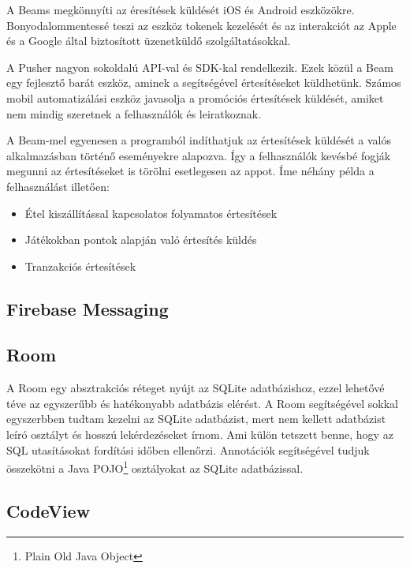 \documentclass{thesis-ekf}
\theoremstyle{definition}
\theoremstyle{remark}
\begin{document}
A Beams megkönnyíti az éresítések küldését iOS és Android eszközökre.
Bonyodalommentessé teszi az eszköz tokenek kezelését és az interakciót az Apple és a Google által biztosított üzenetküldő szolgáltatásokkal.

A Pusher nagyon sokoldalú API-val és SDK-kal rendelkezik. 
Ezek közül a Beam egy fejlesztő barát eszköz, aminek a segítségével értesítéseket küldhetünk.
Számos mobil automatizálási eszköz javasolja a promóciós értesítések küldését, amiket nem mindig szeretnek a felhasználók és leiratkoznak.

A Beam-mel egyenesen a programból indíthatjuk az értesítések küldését a valós alkalmazásban történő eseményekre alapozva. 
Így a felhasználók kevésbé fogják megunni az értesítéseket is törölni esetlegesen az appot. 
Íme néhány példa a felhasználást illetően:

\begin{itemize}
	\item Étel kiszállítással kapcsolatos folyamatos értesítések
	\item Játékokban pontok alapján való értesítés küldés
	\item Tranzakciós értesítések
\end{itemize}


\subsection{Firebase Messaging}

\subsection{Room}

A Room egy absztrakciós réteget nyújt az SQLite adatbázishoz, ezzel lehetővé téve az egyszerűbb és hatékonyabb adatbázis elérést.
A Room segítségével sokkal egyszerbben tudtam kezelni az SQLite adatbázist, mert nem kellett adatbázist leíró osztályt és hosszú lekérdezéseket írnom.
Ami külön tetszett benne, hogy az SQL utasításokat fordítási időben ellenőrzi.
Annotációk segítségével tudjuk összekötni a Java POJO\footnote{Plain Old Java Object} osztályokat az SQLite adatbázissal.

\subsection{CodeView}
\end{document}
